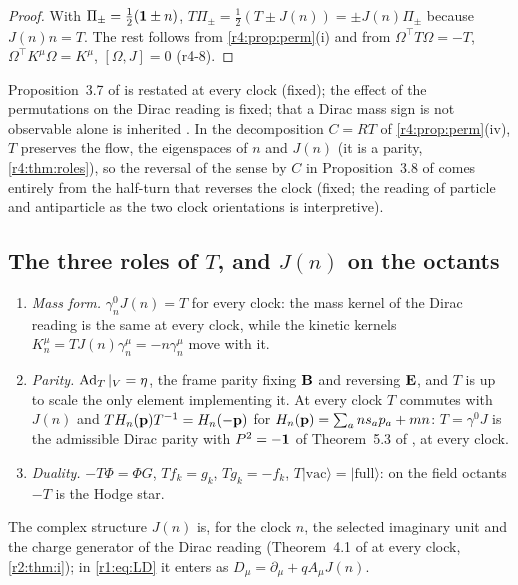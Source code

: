 \begin{proof}
With $\Pi_\pm=\tfrac12(\mathbf 1\pm n)$, $T\Pi_\pm=\tfrac12(T\pm J(n))=\pm J(n)\Pi_\pm$ because $J(n)n=T$. The rest follows from \cref{r4:prop:perm}(i) and from
$\Omega^{\!\top}T\Omega=-T$, $\Omega^{\!\top}K^\mu\Omega=K^\mu$, $[\Omega,J]=0$ (r4-8).
\end{proof}

Proposition~3.7 of \cite{RE} is restated at every clock (fixed); the effect of the permutations on the Dirac reading is fixed; that a Dirac mass
sign is not observable alone is inherited \cite{ItzyksonZuber}. In the decomposition $C=RT$ of \cref{r4:prop:perm}(iv), $T$ preserves the flow,
the eigenspaces of $n$ and $J(n)$ (it is a parity, \cref{r4:thm:roles}), so the reversal of the sense by $C$ in Proposition~3.8 of \cite{RE} comes entirely
from the half-turn that reverses the clock (fixed; the reading of particle and antiparticle as the two clock orientations is interpretive).

\subsection{\texorpdfstring{The three roles of $T$, and $J(n)$ on the octants}{The three roles of T, and J(n) on the octants}}
\label{r4:sec:roles}

\begin{theorem}
\label{r4:thm:roles}
\begin{enumerate}[label=(\alph*),leftmargin=2.2em]
\item \emph{Mass form.} $\gamma^0_nJ(n)=T$ for every clock: the mass kernel of the Dirac reading is the same at every clock, while the kinetic kernels
$K^\mu_n=TJ(n)\gamma^\mu_n=-n\gamma^\mu_n$ move with it.
\item \emph{Parity.} $\operatorname{Ad}_T|_V=\eta$, the frame parity fixing $\mathbf B$ and reversing $\mathbf E$, and $T$ is up to scale the only element implementing it. At every
clock $T$ commutes with $J(n)$ and $TH_n(\mathbf p)T^{-1}=H_n(-\mathbf p)$ for $H_n(\mathbf p)=\sum_ans_ap_a+mn$: $T=\gamma^0J$ is the admissible Dirac parity with $P^2=-\mathbf 1$
of Theorem~5.3 of \cite{ES17}, at every clock.
\item \emph{Duality.} $-T\Phi=\Phi G$, $Tf_k=g_k$, $Tg_k=-f_k$, $T|\mathrm{vac}\rangle=|\mathrm{full}\rangle$: on the field octants $-T$ is the Hodge star.
\end{enumerate}
The complex structure $J(n)$ is, for the clock $n$, the selected imaginary unit and the charge generator of the Dirac reading (Theorem~4.1 of
\cite{ES17} at every clock, \cref{r2:thm:i}); in \cref{r1:eq:LD} it enters as $D_\mu=\partial_\mu+qA_\mu J(n)$.
\end{theorem}

